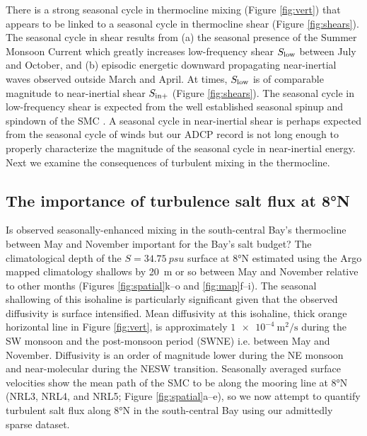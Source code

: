 \documentclass[twocol]{ametsoc}
\begin{document}
There is a strong seasonal cycle in thermocline mixing (Figure \ref{fig:vert}) that appears to be linked to a seasonal cycle in thermocline shear (Figure \ref{fig:shears}).
The seasonal cycle in shear results from
(a) the seasonal presence of the Summer Monsoon Current which greatly increases low-frequency shear \(S_\text{low}\) between July and October, and
(b) episodic energetic downward propagating near-inertial waves observed outside March and April.
At times, \(S_\text{low}\) is of comparable magnitude to near-inertial shear \(S_\text{in+}\) (Figure \ref{fig:shears}).
The seasonal cycle in low-frequency shear is expected from the well established seasonal spinup and spindown of the SMC \citep{Schott2001a}.
A seasonal cycle in near-inertial shear is perhaps expected from the seasonal cycle of winds but our ADCP record is not long enough to properly characterize the magnitude of the seasonal cycle in near-inertial energy.
Next we examine the consequences of turbulent mixing in the thermocline.

\subsection{The importance of turbulence salt flux at 8°N}
\label{sec:orgb4384c6}
\label{sec:js}

Is observed seasonally-enhanced mixing in the south-central Bay's thermocline between May and November important for the Bay's salt budget?
The climatological depth of the \(S=\SI{34.75}{psu}\) surface at 8°N estimated using the Argo mapped climatology shallows by \SI{20}{m} or so between May and November relative to other months (Figures \ref{fig:spatial}k--o and \ref{fig:map}f--i).
The seasonal shallowing of this isohaline is particularly significant given that the observed diffusivity is surface intensified.
Mean diffusivity at this isohaline, thick orange horizontal line in Figure \ref{fig:vert}, is approximately \(\SI{1e-4}{\m\squared\per\s}\) during the SW monsoon and the post-monsoon period (SWNE) i.e. between May and November.
Diffusivity is an order of magnitude lower during the NE monsoon and near-molecular during the NESW transition.
Seasonally averaged surface velocities show the mean path of the SMC to be along the mooring line at 8°N (NRL3, NRL4, and NRL5; Figure \ref{fig:spatial}a--e), so we now attempt to quantify turbulent salt flux along 8°N in the south-central Bay using our admittedly sparse dataset.
\end{document}
